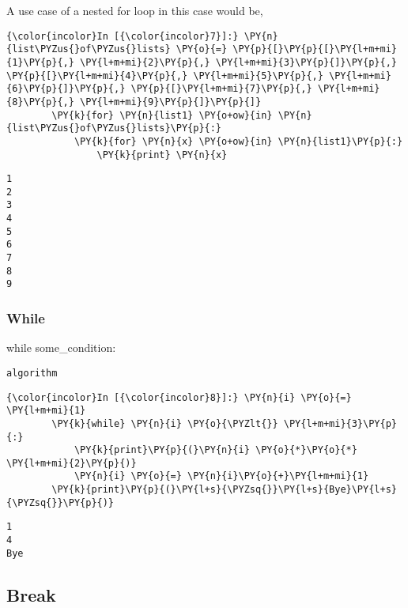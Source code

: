     A use case of a nested for loop in this case would be,

    \begin{Verbatim}[commandchars=\\\{\}]
{\color{incolor}In [{\color{incolor}7}]:} \PY{n}{list\PYZus{}of\PYZus{}lists} \PY{o}{=} \PY{p}{[}\PY{p}{[}\PY{l+m+mi}{1}\PY{p}{,} \PY{l+m+mi}{2}\PY{p}{,} \PY{l+m+mi}{3}\PY{p}{]}\PY{p}{,} \PY{p}{[}\PY{l+m+mi}{4}\PY{p}{,} \PY{l+m+mi}{5}\PY{p}{,} \PY{l+m+mi}{6}\PY{p}{]}\PY{p}{,} \PY{p}{[}\PY{l+m+mi}{7}\PY{p}{,} \PY{l+m+mi}{8}\PY{p}{,} \PY{l+m+mi}{9}\PY{p}{]}\PY{p}{]}
        \PY{k}{for} \PY{n}{list1} \PY{o+ow}{in} \PY{n}{list\PYZus{}of\PYZus{}lists}\PY{p}{:}
            \PY{k}{for} \PY{n}{x} \PY{o+ow}{in} \PY{n}{list1}\PY{p}{:}
                \PY{k}{print} \PY{n}{x}
\end{Verbatim}

    \begin{Verbatim}[commandchars=\\\{\}]
1
2
3
4
5
6
7
8
9
    \end{Verbatim}

    \subsubsection{While}\label{while}

    while some\_condition:

\begin{verbatim}
algorithm
\end{verbatim}

    \begin{Verbatim}[commandchars=\\\{\}]
{\color{incolor}In [{\color{incolor}8}]:} \PY{n}{i} \PY{o}{=} \PY{l+m+mi}{1}
        \PY{k}{while} \PY{n}{i} \PY{o}{\PYZlt{}} \PY{l+m+mi}{3}\PY{p}{:}
            \PY{k}{print}\PY{p}{(}\PY{n}{i} \PY{o}{*}\PY{o}{*} \PY{l+m+mi}{2}\PY{p}{)}
            \PY{n}{i} \PY{o}{=} \PY{n}{i}\PY{o}{+}\PY{l+m+mi}{1}
        \PY{k}{print}\PY{p}{(}\PY{l+s}{\PYZsq{}}\PY{l+s}{Bye}\PY{l+s}{\PYZsq{}}\PY{p}{)}
\end{Verbatim}

    \begin{Verbatim}[commandchars=\\\{\}]
1
4
Bye
    \end{Verbatim}

    \subsection{Break}\label{break}

